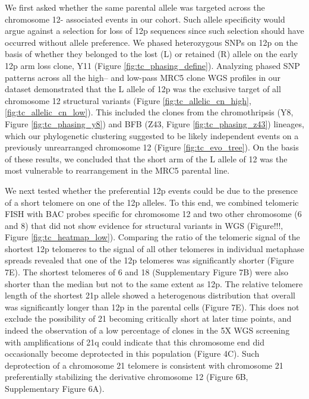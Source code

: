 \documentclass[phd,tocprelim]{cornell}
\begin{document}
We first asked whether the same parental allele was targeted across the chromosome 12- associated events in our cohort. Such allele specificity would argue against a selection for loss of 12p sequences since such selection should have occurred without allele preference. We phased heterozygous SNPs on 12p on the basis of whether they belonged to the lost (L) or retained (R) allele on the early 12p arm loss clone, Y11 (Figure \ref{fig:tc_phasing_define}). Analyzing phased SNP patterns across all the high– and low-pass MRC5 clone WGS profiles in our dataset demonstrated that the L allele of 12p was the exclusive target of all chromosome 12 structural variants (Figure \ref{fig:tc_allelic_cn_high}, \ref{fig:tc_allelic_cn_low}). This included the clones from the chromothripsis (Y8, Figure \ref{fig:tc_phasing_y8}) and BFB (Z43, Figure \ref{fig:tc_phasing_z43}) lineages, which our phylogenetic clustering suggested to be likely independent events on a previously unrearranged chromosome 12 (Figure \ref{fig:tc_evo_tree}). On the basis of these results, we concluded that the short arm of the L allele of 12 was the most vulnerable to rearrangement in the MRC5 parental line.

We next tested whether the preferential 12p events could be due to the presence of a short telomere on one of the 12p alleles. To this end, we combined telomeric FISH with BAC probes specific for chromosome 12 and two other chromosome (6 and 8) that did not show evidence for structural variants in WGS (Figure!!!, Figure \ref{fig:tc_heatmap_low}). Comparing the ratio of the telomeric signal of the shortest 12p telomeres to the signal of all other telomeres in individual metaphase spreads revealed that one of the 12p telomeres was significantly shorter (Figure 7E). The shortest telomeres of 6 and 18 (Supplementary Figure 7B) were also shorter than the median but not to the same extent as 12p. The relative telomere length of the shortest 21p allele showed a heterogenous distribution that overall was significantly longer than 12p in the parental cells (Figure 7E). This does not exclude the possibility of 21 becoming critically short at later time points, and indeed the observation of a low percentage of clones in the 5X WGS screening with amplifications of 21q could indicate that this chromosome end did occasionally become deprotected in this population (Figure 4C). Such deprotection of a chromosome 21 telomere is consistent with chromosome 21 preferentially stabilizing the derivative chromosome 12 (Figure 6B, Supplementary Figure 6A).
\end{document}
